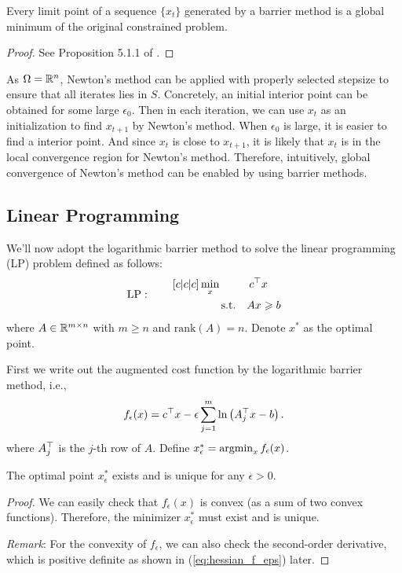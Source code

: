 \begin{proposition}
Every limit point of a sequence $\{x_t\}$ generated by a barrier method is a global minimum of the original constrained problem. 
\end{proposition}
\begin{proof}
See Proposition 5.1.1 of \cite{bertsekas2016nonlinear}.
\end{proof}

As $\Omega=\mathbb{R}^n$, Newton's method can be applied with properly selected stepsize to ensure that all iterates lies in $S$. Concretely, an initial interior point can be obtained for some large $\epsilon_0$. Then in each iteration, we can use $x_t$ as an initialization to find $x_{t+1}$ by Newton's method. When $\epsilon_0$ is large, it is easier to find a interior point. And since $x_t$ is close to $x_{t+1}$, it is likely that $x_t$ is in the local convergence region for Newton's method. Therefore, intuitively, global convergence of Newton's method can be enabled by using barrier methods.

\subsection{Linear Programming}
We'll now adopt the logarithmic barrier method to solve the linear programming (LP) problem defined as follows:
\begin{equation}
\label{eq:LP_def}
\text{LP}:\qquad
\begin{aligned}[c|c|c]
&\min_x &c^\trans&x\\
&\qquad\text{s.t.} &Ax&\ge b
\end{aligned}
\end{equation}
where $A\in{\mathbb{R}}^{m\times n}$ with $m\ge n$ and $\mathrm{rank}(A)=n$. Denote $x^*$ as the optimal point. 

First we write out the augmented cost function by the logarithmic barrier method, i.e.,
\begin{equation}
\label{eq:LP_aug_cost}
f_\epsilon(x) = c^\top x-\epsilon \sum_{j=1}^m\ln\left(A^\top_j x-b\right).
\end{equation}
where $A^\top_j$ is the $j$-th row of $A$. Define $x^*_\epsilon=\mathop{\rm argmin}_x f_\epsilon(x)$. 

\begin{fact}
The optimal point $x^*_\epsilon$ exists and is unique for any $\epsilon>0$.
\end{fact}
\begin{proof}
We can easily check that $f_\epsilon(x)$ is convex (as a sum of two convex functions). Therefore, the minimizer $x^*_\epsilon$ must exist and is unique.

\textit{Remark}: For the convexity of $f_\epsilon$, we can also check the second-order derivative, which is positive definite as shown in (\ref{eq:hessian_f_eps}) later.
\end{proof}

